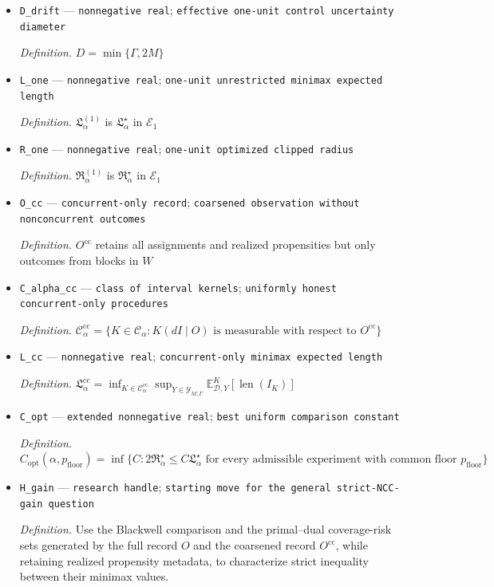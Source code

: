 \documentclass{article}
\begin{document}
\begin{itemize}
  \item \texttt{D\_\allowbreak{}drift} --- \texttt{nonnegative real}; \texttt{effective one-\allowbreak{}unit control uncertainty diameter}
  \par\smallskip\noindent\emph{Definition.} \(D=\min\{\Gamma,2M\}\)
  \item \texttt{L\_\allowbreak{}one} --- \texttt{nonnegative real}; \texttt{one-\allowbreak{}unit unrestricted minimax expected length}
  \par\smallskip\noindent\emph{Definition.} \(\mathfrak L_\alpha^{(1)}\) is \(\mathfrak L_\alpha^\star\) in \(\mathcal E_1\)
  \item \texttt{R\_\allowbreak{}one} --- \texttt{nonnegative real}; \texttt{one-\allowbreak{}unit optimized clipped radius}
  \par\smallskip\noindent\emph{Definition.} \(\mathfrak R_\alpha^{(1)}\) is \(\mathfrak R_\alpha^\star\) in \(\mathcal E_1\)
  \item \texttt{O\_\allowbreak{}cc} --- \texttt{concurrent-\allowbreak{}only record}; \texttt{coarsened observation without nonconcurrent outcomes}
  \par\smallskip\noindent\emph{Definition.} \(O^{\mathrm{cc}}\) retains all assignments and realized propensities but only outcomes from blocks in \(W\)
  \item \texttt{C\_\allowbreak{}alpha\_\allowbreak{}cc} --- \texttt{class of interval kernels}; \texttt{uniformly honest concurrent-\allowbreak{}only procedures}
  \par\smallskip\noindent\emph{Definition.} \(\mathcal C_\alpha^{\mathrm{cc}}=\{K\in\mathcal C_\alpha:K(dI\mid O)\text{ is measurable with respect to }O^{\mathrm{cc}}\}\)
  \item \texttt{L\_\allowbreak{}cc} --- \texttt{nonnegative real}; \texttt{concurrent-\allowbreak{}only minimax expected length}
  \par\smallskip\noindent\emph{Definition.} \(\mathfrak L_\alpha^{\mathrm{cc}}=\inf_{K\in\mathcal C_\alpha^{\mathrm{cc}}}\sup_{Y\in\mathcal Y_{M,\Gamma}}\mathbb E^K_{\mathcal D,Y}[\operatorname{len}(I_K)]\)
  \item \texttt{C\_\allowbreak{}opt} --- \texttt{extended nonnegative real}; \texttt{best uniform comparison constant}
  \par\smallskip\noindent\emph{Definition.} \(C_{\mathrm{opt}}(\alpha,p_{\mathrm{floor}})=\inf\{C:2\mathfrak R_\alpha^\star\le C\mathfrak L_\alpha^\star\text{ for every admissible experiment with common floor }p_{\mathrm{floor}}\}\)
  \item \texttt{H\_\allowbreak{}gain} --- \texttt{research handle}; \texttt{starting move for the general strict-\allowbreak{}NCC-\allowbreak{}gain question}
  \par\smallskip\noindent\emph{Definition.} Use the Blackwell comparison and the primal--dual coverage-risk sets generated by the full record \(O\) and the coarsened record \(O^{\mathrm{cc}}\), while retaining realized propensity metadata, to characterize strict inequality between their minimax values.
\end{itemize}
\end{document}

